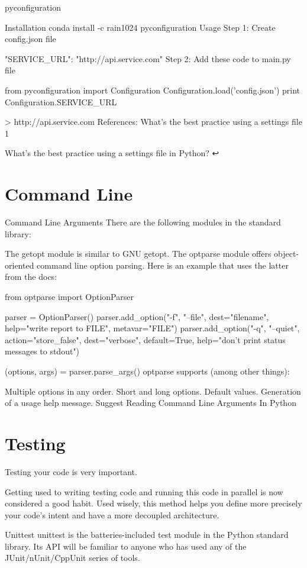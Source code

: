 pyconfiguration

Installation
conda install -c rain1024 pyconfiguration
Usage
Step 1: Create config.json file

{
  "SERVICE_URL": "http://api.service.com"
}
Step 2: Add these code to main.py file

from pyconfiguration import Configuration
Configuration.load('config.json')
print Configuration.SERVICE_URL

> http://api.service.com
References: What's the best practice using a settings file 1

What's the best practice using a settings file in Python? ↩

\section{Command Line}

Command Line Arguments
There are the following modules in the standard library:

The getopt module is similar to GNU getopt.
The optparse module offers object-oriented command line option parsing.
Here is an example that uses the latter from the docs:

from optparse import OptionParser

parser = OptionParser()
parser.add_option("-f", "--file", dest="filename",
                  help="write report to FILE", metavar="FILE")
parser.add_option("-q", "--quiet",
                  action="store_false", dest="verbose", default=True,
                  help="don't print status messages to stdout")

(options, args) = parser.parse_args()
optparse supports (among other things):

Multiple options in any order.
Short and long options.
Default values.
Generation of a usage help message.
Suggest Reading
Command Line Arguments In Python

\section{Testing}

Testing your code is very important.

Getting used to writing testing code and running this code in parallel is now considered a good habit. Used wisely, this method helps you define more precisely your code’s intent and have a more decoupled architecture.

Unittest
unittest is the batteries-included test module in the Python standard library. Its API will be familiar to anyone who has used any of the JUnit/nUnit/CppUnit series of tools.

